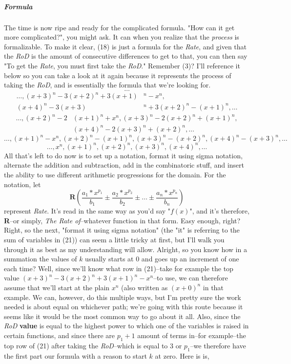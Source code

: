 \documentclass[12pt, letterpaper]{report}
\begin{document}
\subparagraph{Formula}The time is now ripe and ready for the complicated formula. "How can it get more complicated?", you might ask. It can when you realize that the \textit{process} is formalizable. To make it clear, (18) is just a formula for the \textit{Rate}, and given that the \textit{RoD} is the amount of consecutive differences to get to that, you can then say "To get the \textit{Rate}, you must first take the \textit{RoD}." Remember (3)? I'll reference it below so you can take a look at it again because it represents the process of taking the \textit{RoD}, and is essentially the formula that we're looking for. 
$$\dots$$
\begin{equation*}
\begin{split}
\dots, (x+3)^n-3(x+2)^n+3(x+1)&^n-x^n,  \\
(x+4)^n-3(x+3)&^n+3(x+2)^n-(x+1)^n, \dots
\end{split}
\end{equation*}
\begin{equation*}
\begin{split}
\dots, (x+2)^n-2&(x+1)^n+x^n, (x+3)^n-2(x+2)^n+(x+1)^n, \\
&(x+4)^n-2(x+3)^n+(x+2)^n, \dots
\end{split}
\end{equation*}
$$\dots, (x+1)^n-x^n, (x+2)^n-(x+1)^n, (x+3)^n-(x+2)^n, (x+4)^n-(x+3)^n, \dots$$
\begin{equation}\dots, x^n, (x+1)^n, (x+2)^n, (x+3)^n, (x+4)^n, \dots\end{equation}
All that's left to do now is to set up a notation, format it using sigma notation, alternate the addition and subtraction, add in the combinatoric stuff, and insert the ability to use different arithmetic progressions for the domain.
For the notation, let 
\begin{equation}\textbf{R}(\frac{a_{1}*x^{p_{1}}}{b_{1}} \pm \frac{a_{2}*x^{p_{2}}}{b_{2}} \pm \dots \pm \frac{a_{n}*x^{p_{n}}}{b_{n}})\end{equation}
represent \textit{Rate}. It's read in the same way as you'd say "$f(x)$", and it's therefore, \textbf{R}--or simply, \textit{The Rate of}--whatever  function in that form. Easy enough, right? Right, so the next, "format it using sigma notation" (the "it" is referring to the sum of variables in (21)) can seem a little tricky at first, but I'll walk you through it as best as my understanding will allow. Alright, so you know how in a summation the values of $k$ usually starts at 0 and goes up an increment of one each time? Well, since we'll know what row in (21)--take for example the top value $(x+3)^n-3(x+2)^n+3(x+1)^n-x^n$--to use, we can therefore assume that we'll start at the plain $x^n$ (also written as $(x+0)^n$ in that example. We can, however, do this multiple ways, but I'm pretty sure the work needed is about equal on whichever path; we're going with this route because it seems like it would be the most common way to go about it all. Also, since the \textit{RoD} \textbf{value} is equal to the highest power to which one of the variables is raised in certain functions, and since there are $p_{1}+1$ amount of terms in--for example--the top row of (21) after taking the \textit{RoD}--which is equal to 3 or $p_{1}$--we therefore have the first part our formula with a reason to start $k$ at zero. Here is is,
\end{document}
